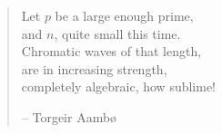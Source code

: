 


\vspace*{5cm}

\begin{verse}
    \hspace{2em}Let $p$ be a large enough prime, \\
    \hspace{2em}and $n$, quite small this time. \\
    \hspace{2em}Chromatic waves of that length, \\
    \hspace{2em}are in increasing strength, \\
    \hspace{2em}completely algebraic, how sublime! 

    \hspace{\fill}-- Torgeir Aambø
\end{verse}
